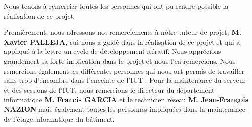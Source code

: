 Nous tenons à remercier toutes les personnes qui ont pu rendre possible la réalisation de ce projet.

\bigbreak
Premièrement, nous adressons nos remerciements à nôtre tuteur de projet, \textbf{M. Xavier PALLEJA}, qui nous a guidé dans la réalisation de ce projet et qui a appliqué à la lettre un cycle de développement itératif.
Nous apprécions grandement sa forte implication dans le projet et nous l'en remercions.
\bigbreak
Nous remercions également les différentes personnes qui nous ont permis de travailler sans trop d'encombre dans l'enceinte de l'IUT . Pour la maintenance du serveur et des sessions de l'IUT, nous remercions le directeur du département informatique \textbf{M. Francis GARCIA} et le technicien réseau \textbf{M. Jean-François NAZION} mais également toutes les personnes impliquées dans la maintenance de l'étage informatique du bâtiment.